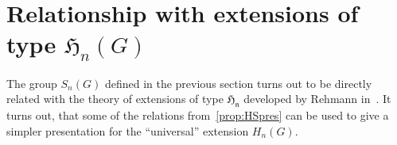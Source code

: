 \documentclass[oneside, 12pt]{amsart}
\theoremstyle{plain}
\numberwithin{equation}{section}
\numberwithin{lemma}{section}
\theoremstyle{remark}
\theoremstyle{definition}
\DeclareMathOperator{\HH}{H}
\newcommand{\ZZ}{\mathbb{Z}}
\begin{document}
\begin{comment}
The same is true for the relations obtained from~\eqref{Th262}--\eqref{Th263}.
For example, if $U$ is obtained from $U^*$ by insertion or deletion of $(ij)_a \cdot (ij)_a$ then by~\cref{rm:tau-property}
$\tau(U)$ is obtained from $\tau(U^*)$ by insertion or deletion of $h_{kl}(a) \cdot h_{lk}(a)$ for some $k\neq l$.
Since $\pi(U_1)$ is a trivial permutation, it also follows from~\cref{rm:tau-property} that expressions in both sides of~\eqref{Th263} are equal words.
\end{proof}

\subsection{Computation of $\pi_1$ and $\pi_2$}

Now let us compute the cokernel of $\mu$.
We claim that $\mathrm{Im}(G) = D_n(G) \ltimes S_n$, where $D_n(G)$ denotes the subgroup of $G^n$ consisting of vectors
 $(g_1,\ldots, g_n)$ for which the product $g_1\cdot \ldots \cdot g_n$ lies in $[G, G]$. 
The inclusion $\subseteq$ is immediately obvious from the definition of $\mu$.
To prove the inverse inclusion notice that $D_n(G)$ is generated by elements $d_{ij}(g)$, $i\neq j$, $g\in G$ (cf.~\cite[\S~2]{Reh78}).
Here $d_{ij}(g)$ is the element of $G^n$ defined as follows: 
 the $k$-th component of $d_{ij}(g)$ equals $g$ for $k=i$, $g^{-1}$ for $k=j$ and is $1$ otherwise.
It is not hard to see that the cokernel of $\mu$ is $\HH_1(G, \ZZ) = G_{ab}$.
\end{comment}

\section{Relationship with extensions of type \texorpdfstring{$\mathfrak{H}_n(G)$}{Hn(G)}}
The group $S_n(G)$ defined in the previous section turns out to be directly related with the theory
 of extensions of type $\mathfrak{H_n}$ developed by Rehmann in~\cite{Reh78}.
It turns out, that some of the relations from~\cref{prop:HSpres} can be used to give a simpler presentation for the ``universal'' extension $H_n(G)$.
\end{document}

